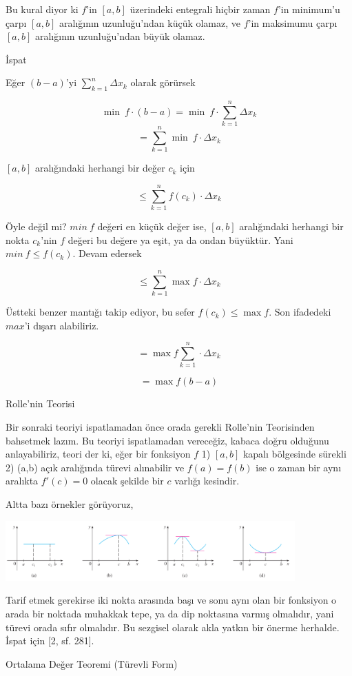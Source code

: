 \documentclass[12pt,fleqn]{article}\usepackage{../../common}
\begin{document}
Bu kural diyor ki $f$'in $[a,b]$ üzerindeki entegrali hiçbir zaman $f$'in
minimum'u çarpı $[a,b]$ aralığının uzunluğu'ndan küçük olamaz, ve $f$'in
maksimumu çarpı $[a,b]$ aralığının uzunluğu'ndan büyük olamaz. 

İspat

Eğer $(b-a)$'yi $ \sum_{k=1}^n \Delta x_k$ olarak görürsek

$$ \min \ f \cdot (b-a) = \min \ f \cdot \sum_{k=1}^n \Delta x_k $$
$$  = \sum_{k=1}^n \min \ f \cdot \Delta x_k  $$

$[a,b]$ aralığındaki herhangi bir değer $c_k$ için

$$  \le \sum_{k=1}^n f(c_k) \cdot \Delta x_k  $$

Öyle değil mi? $min \ f$ değeri en küçük değer ise, $[a,b]$ aralığındaki
herhangi bir nokta $c_k$'nin $f$ değeri bu değere ya eşit, ya da ondan
büyüktür. Yani $min \ f \le f(c_k)$. Devam edersek

$$  \le \sum_{k=1}^n \max f \cdot \Delta x_k  $$

Üstteki benzer mantığı takip ediyor, bu sefer $f(c_k) \le \max f $. Son
ifadedeki $max$'i dışarı alabiliriz. 

$$ = \max f \sum_{k=1}^n \cdot \Delta x_k  $$

$$ = \max f (b-a)  $$

Rolle'nin Teorisi

Bir sonraki teoriyi ispatlamadan önce orada gerekli Rolle'nin Teorisinden
bahsetmek lazım. Bu teoriyi ispatlamadan vereceğiz, kabaca doğru olduğunu
anlayabiliriz, teori der ki, eğer bir fonksiyon $f$ 1) $[a,b]$ kapalı bölgesinde
sürekli 2) (a,b) açık aralığında türevi alınabilir ve $f(a)=f(b)$ ise o zaman
bir aynı aralıkta $f'(c)=0$ olacak şekilde bir $c$ varlığı kesindir.

Altta bazı örnekler görüyoruz,

\includegraphics[width=30em]{calc_multi_app_02.png}

Tarif etmek gerekirse iki nokta arasında başı ve sonu aynı olan bir fonksiyon o
arada bir noktada muhakkak tepe, ya da dip noktasına varmış olmalıdır, yani
türevi orada sıfır olmalıdır. Bu sezgisel olarak akla yatkın bir önerme
herhalde. İspat için [2, sf. 281].

Ortalama Değer Teoremi (Türevli Form)
\end{document}
